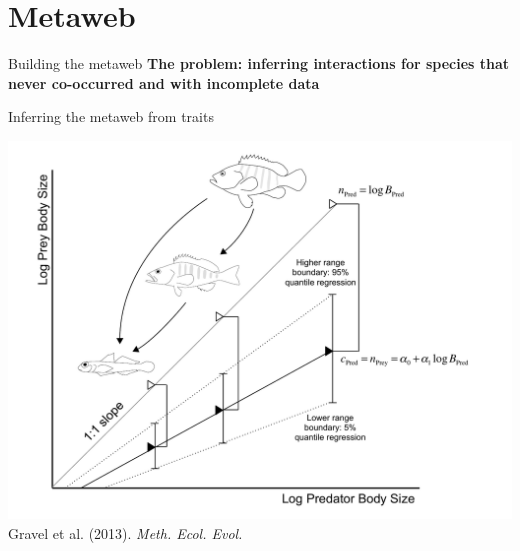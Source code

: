 \documentclass{eecslides}
\begin{document}

	\section{Metaweb}


	\begin{frame}{Building the metaweb}
	 \alert{\textbf{The problem: inferring interactions for species that never co-occurred and with incomplete data}}
	\end{frame}


	\begin{frame}{Inferring the metaweb from traits}
		\begin{center}
			\includegraphics[height=0.55\textheight]{fig_MEE}\\
			\footnotesize{Gravel et al. (2013). \textit{Meth. Ecol. Evol.}}
		\end{center}
	\end{frame}

\end{document}
